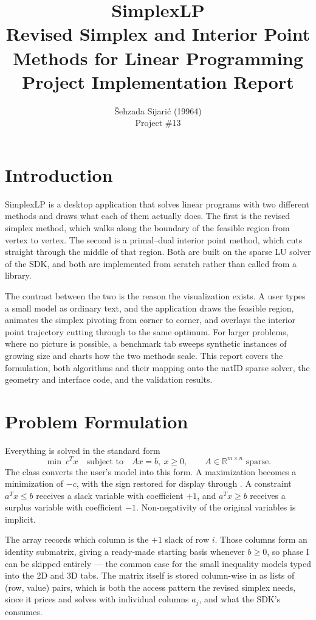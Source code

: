 \documentclass[12pt, a4paper]{article}
\title{\textbf{SimplexLP}\\ \large Revised Simplex and Interior Point Methods for Linear Programming\\ \large Project Implementation Report}
\author{Šehzada Sijarić (19964) \\ \small Project \#13}
\date{}
\begin{document}
\maketitle

\section{Introduction}
SimplexLP is a desktop application that solves linear programs with two different methods and draws what each of them actually does. The first is the revised simplex method, which walks along the boundary of the feasible region from vertex to vertex. The second is a primal--dual interior point method, which cuts straight through the middle of that region. Both are built on the sparse LU solver of the  SDK, and both are implemented from scratch rather than called from a library.

The contrast between the two is the reason the visualization exists. A user types a small model as ordinary text, and the application draws the feasible region, animates the simplex pivoting from corner to corner, and overlays the interior point trajectory cutting through to the same optimum. For larger problems, where no picture is possible, a benchmark tab sweeps synthetic instances of growing size and charts how the two methods scale. This report covers the formulation, both algorithms and their mapping onto the natID sparse solver, the geometry and interface code, and the validation results.

\section{Problem Formulation}
Everything is solved in the standard form
\[
    \min\ c^{T}x \quad \text{subject to} \quad Ax = b,\ x \ge 0, \qquad A \in \mathbb{R}^{m \times n} \text{ sparse.}
\]
The class  converts the user's model into this form. A maximization becomes a minimization of $-c$, with the sign restored for display through . A constraint $a^{T}x \le b$ receives a slack variable with coefficient $+1$, and $a^{T}x \ge b$ receives a surplus variable with coefficient $-1$. Non-negativity of the original variables is implicit.

The array  records which column is the $+1$ slack of row $i$. Those columns form an identity submatrix, giving a ready-made starting basis whenever $b \ge 0$, so phase I can be skipped entirely --- the common case for the small inequality models typed into the 2D and 3D tabs. The matrix itself is stored column-wise in  as lists of (row, value) pairs, which is both the access pattern the revised simplex needs, since it prices and solves with individual columns $a_j$, and what the SDK's  consumes.
\end{document}
